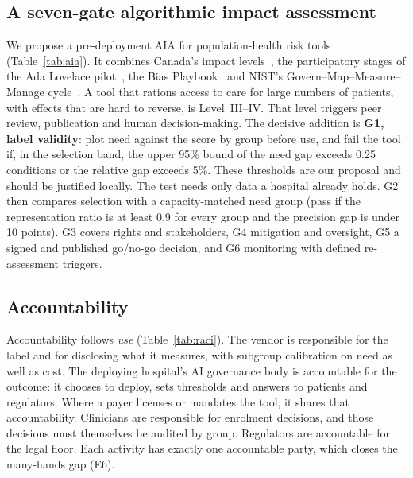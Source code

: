 \documentclass[conference]{IEEEtran}
\begin{document}
\subsection{A seven-gate algorithmic impact assessment}
We propose a pre-deployment AIA for population-health risk tools (Table~\ref{tab:aia}). It combines Canada's impact levels~\cite{canada_dadm}, the participatory stages of the Ada Lovelace pilot~\cite{ada2022}, the Bias Playbook~\cite{booth2021} and NIST's Govern--Map--Measure--Manage cycle~\cite{nist2023}. A tool that rations access to care for large numbers of patients, with effects that are hard to reverse, is Level~III--IV. That level triggers peer review, publication and human decision-making. The decisive addition is \textbf{G1, label validity}: plot need against the score by group before use, and fail the tool if, in the selection band, the upper 95\% bound of the need gap exceeds 0.25 conditions or the relative gap exceeds 5\%. These thresholds are our proposal and should be justified locally. The test needs only data a hospital already holds. G2 then compares selection with a capacity-matched need group (pass if the representation ratio is at least 0.9 for every group and the precision gap is under 10 points). G3 covers rights and stakeholders, G4 mitigation and oversight, G5 a signed and published go/no-go decision, and G6 monitoring with defined re-assessment triggers.



\subsection{Accountability}
Accountability follows \emph{use} (Table~\ref{tab:raci}). The vendor is responsible for the label and for disclosing what it measures, with subgroup calibration on need as well as cost. The deploying hospital's AI governance body is accountable for the outcome: it chooses to deploy, sets thresholds and answers to patients and regulators. Where a payer licenses or mandates the tool, it shares that accountability. Clinicians are responsible for enrolment decisions, and those decisions must themselves be audited by group. Regulators are accountable for the legal floor. Each activity has exactly one accountable party, which closes the many-hands gap (E6).


\end{document}

